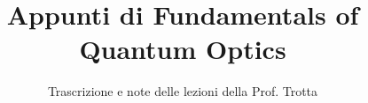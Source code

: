 \documentclass[a4paper,12pt]{article}
\title{Appunti di Fundamentals of Quantum Optics}
\author{Trascrizione e note delle lezioni della Prof. Trotta}
\date{}
\begin{document}
\maketitle
\projectintro
\tableofcontents
\newpage



\end{document}
